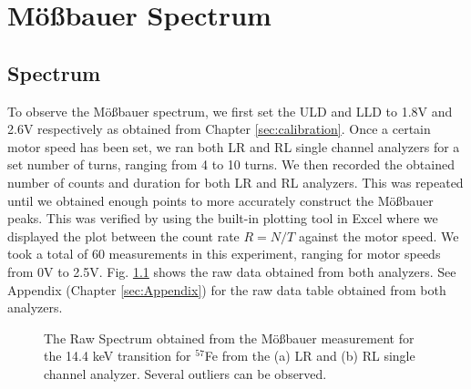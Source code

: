 \documentclass[a4paper]{report}
\numberwithin{equation}{section}
\begin{document}

\chapter{M\"o{\ss}bauer Spectrum} \label{sec:moess}

\section{Spectrum}

To observe the M\"o{\ss}bauer spectrum, we first set the ULD and LLD to 1.8V and 2.6V respectively as obtained from Chapter \ref{sec:calibration}. 
Once a certain motor speed has been set, we ran both LR and RL single channel analyzers for a set number of turns, ranging from 4 to 10
turns. We then recorded the obtained number of counts and duration for both LR and RL analyzers. This was repeated until we obtained 
enough points to more accurately construct the M\"o{\ss}bauer peaks. This was verified by using the built-in plotting tool in Excel where we 
displayed the plot between the count rate $R = N / T$ against the motor speed. We took a total of 60 measurements in this experiment, ranging for 
motor speeds from 0V to 2.5V. Fig. \ref{fig:moess_raw} shows the raw data obtained from both analyzers. See Appendix (Chapter \ref{sec:Appendix}) for the raw data table obtained from both analyzers. \par 

\begin{figure}[htb!]
	\centering
	\quad
	\centering
	\caption{The Raw Spectrum obtained from the M\"o{\ss}bauer measurement for the 14.4 keV transition for $^{57}$Fe from the (a) LR and (b) RL 
	single channel analyzer. Several outliers can be observed.}
	\label{fig:moess_raw}
\end{figure}
\end{document}
